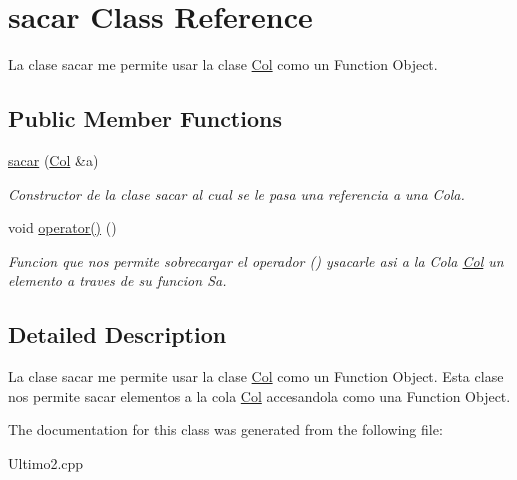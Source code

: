 \hypertarget{classsacar}{
\section{sacar Class Reference}
\label{classsacar}
}


La clase sacar me permite usar la clase \hyperlink{classCol}{Col} como un Function Object.  


\subsection*{Public Member Functions}
\begin{DoxyCompactItemize}
\item 
\hypertarget{classsacar_a9e7ea325277da1d2d1008b81948ae0d5}{
\hyperlink{classsacar_a9e7ea325277da1d2d1008b81948ae0d5}{sacar} (\hyperlink{classCol}{Col} \&a)}
\label{classsacar_a9e7ea325277da1d2d1008b81948ae0d5}

\begin{DoxyCompactList}\small\item\em Constructor de la clase sacar al cual se le pasa una referencia a una Cola. \item\end{DoxyCompactList}\item 
\hypertarget{classsacar_a22582e4dc51cb2be1261f8c9487940d4}{
void \hyperlink{classsacar_a22582e4dc51cb2be1261f8c9487940d4}{operator()} ()}
\label{classsacar_a22582e4dc51cb2be1261f8c9487940d4}

\begin{DoxyCompactList}\small\item\em Funcion que nos permite sobrecargar el operador () ysacarle asi a la Cola \hyperlink{classCol}{Col} un elemento a traves de su funcion Sa. \item\end{DoxyCompactList}\end{DoxyCompactItemize}


\subsection{Detailed Description}
La clase sacar me permite usar la clase \hyperlink{classCol}{Col} como un Function Object. Esta clase nos permite sacar elementos a la cola \hyperlink{classCol}{Col} accesandola como una Function Object. 

The documentation for this class was generated from the following file:\begin{DoxyCompactItemize}
\item 
Ultimo2.cpp\end{DoxyCompactItemize}
